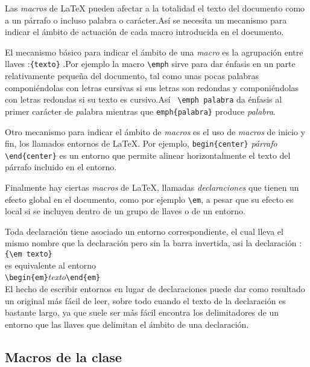 Las \emph{macros} de \LaTeX{} pueden afectar a la totalidad el texto del documento como a un párrafo o incluso palabra  o carácter.Así se necesita un mecanismo para indicar el ámbito de actuación de cada macro introducida en el documento.

El mecanismo básico para indicar el ámbito de una  \emph{macro}  es la agrupación entre llaves :\verb|{texto}| .Por ejemplo la macro \verb|\emph| sirve para dar énfasis en un parte relativamente pequeña del documento, tal como unas pocas palabras componiéndolas con letras cursivas si sus letras son redondas y componiéndolas con letras redondas si su texto es cursivo.Así \verb| \emph palabra| da énfasis al primer carácter de \emph palabra mientras que  \verb|emph{palabra}| produce \emph{palabra}.

Otro mecanismo para indicar el ámbito de \emph{macros} es el uso de \emph{macros} de inicio y fin, los llamados entornos de \LaTeX{}. Por ejemplo, \verb|begin{center}| \emph{párrafo} \verb|\end{center}|  es un entorno que permite alinear horizontalmente el texto del párrafo incluido en el entorno.

Finalmente hay ciertas \emph{macros} de \LaTeX{}, llamadas \emph{declaraciones} que tienen un efecto global en el documento, como por ejemplo \verb|\em|, a pesar que su efecto es local si se incluyen dentro de un grupo de llaves o de un entorno.

Toda declaración tiene asociado un entorno correspondiente, el cual lleva el mismo nombre que la declaración pero sin la barra invertida, asi la declaración :\\

\verb|{\em texto}|\\

\noindent es equivalente al entorno\\

\verb|\begin{em}|\emph{texto}\verb|\end{em}| \\

El hecho de escribir entornos en lugar de declaraciones puede dar como resultado un original más fácil de leer,  sobre todo cuando el texto de la declaración es bastante largo, ya que suele ser más fácil encontra los delimitadores de un entorno que las llaves que delimitan el ámbito de una declaración.

\subsection{Macros de la clase}

